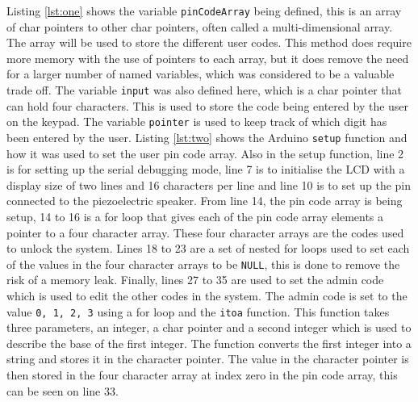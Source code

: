   Listing \ref{lst:one} shows the variable \verb|pinCodeArray| being defined, this is an array of char pointers to other char pointers, often called a multi-dimensional array.
  The array will be used to store the different user codes.
  This method does require more memory with the use of pointers to each array, but it does remove the need for a larger number of named variables, which was considered to be a valuable trade off.
  The variable \verb|input| was also defined here, which is a char pointer that can hold four characters.
  This is used to store the code being entered by the user on the keypad.
  The variable \verb|pointer| is used to keep track of which digit has been entered by the user.
  Listing \ref{lst:two} shows the Arduino \verb|setup| function and how it was used to set the user pin code array.
  Also in the setup function, line 2 is for setting up the serial debugging mode, line 7 is to initialise the LCD with a display size of two lines and 16 characters per line and line 10 is to set up the pin connected to the piezoelectric speaker.
  From line 14, the pin code array is being setup, 14 to 16 is a for loop that gives each of the pin code array elements a pointer to a four character array.
  These four character arrays are the codes used to unlock the system.
  Lines 18 to 23 are a set of nested for loops used to set each of the values in the four character arrays to be \verb|NULL|, this is done to remove the risk of a memory leak.
  Finally, lines 27 to 35 are used to set the admin code which is used to edit the other codes in the system.
  The admin code is set to the value \verb|0, 1, 2, 3| using a for loop and the \verb|itoa| function.
  This function takes three parameters, an integer, a char pointer and a second integer which is used to describe the base of the first integer.
  The function converts the first integer into a string and stores it in the character pointer.
  The value in the character pointer is then stored in the four character array at index zero in the pin code array, this can be seen on line 33.

  

